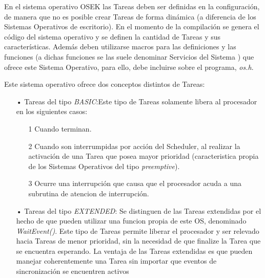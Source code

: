 \documentclass[12pt,letterpaper]{article}
\begin{document}
En el sistema operativo OSEK las Tareas deben ser definidas en la configuración, de manera que no es posible crear Tareas de forma dinámica (a diferencia de los Sistemas Operativos de escritorio). En el momento de la compilación se genera el código del sistema operativo y se definen la cantidad de Tareas y sus características. Además deben utilizarse macros para las definiciones y las funciones (a dichas funciones se las suele denominar Servicios del Sistema ) que ofrece este Sistema Operativo, para ello, debe incluirse sobre el programa, \textit{os.h}.

Este sistema operativo ofrece dos conceptos distintos de Tareas:
\begin{enumerate}
\item[•]Tareas del tipo \emph{BASIC}:Este tipo de Tareas solamente libera al procesador en los siguientes casos:
\begin{enumerate}
\item[1]Cuando terminan.
\item[2]Cuando son interrumpidas por acción del Scheduler, al realizar la activación de una Tarea que posea mayor prioridad (caracteristica propia de los Sistemas Operativos del tipo \textit{preemptive}).
\item[3]Ocurre una interrupción que causa que el procesador acuda a una subrutina de atencion de interrupción.
\end{enumerate}
\item[•]Tareas del tipo \emph{EXTENDED}: Se distinguen de las Tareas extendidas por el hecho de que pueden utilizar una funcion propia de este OS, denominado \textit{WaitEvent()}. Este tipo de Tareas permite liberar el procesador y ser relevado hacia Tareas de menor prioridad, sin la necesidad de que finalize la Tarea que se encuentra esperando.
La ventaja de las Tareas extendidas es que pueden manejar coherentemente una Tarea sin importar que eventos de sincronización se encuentren activos%

\end{enumerate}
\end{document}

